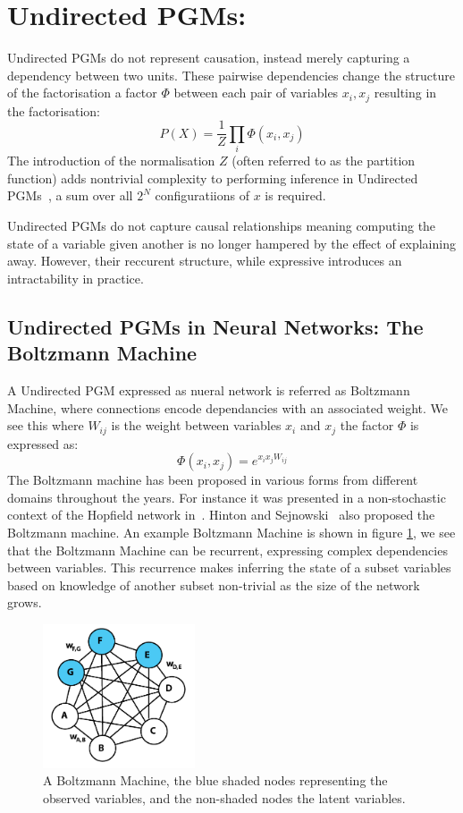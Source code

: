 \section{Undirected PGMs:}

Undirected PGMs do not represent causation, instead merely capturing a dependency between two units. These pairwise dependencies change the structure of the factorisation a factor $\Phi$ between each pair of variables $x_i,x_j$ resulting in the factorisation:
$$
P(X) = \frac{1}{Z} \prod_i \Phi(x_i, x_j)
$$
The introduction of the normalisation $Z$ (often referred to as the partition function) adds nontrivial complexity to performing inference in Undirected PGMs~\cite{Salakhutdinov08learningand}, a sum over all $2^N$ configuratiions of $x$ is required.

Undirected PGMs do not capture causal relationships meaning computing the state of a variable given another is no longer hampered by the effect of explaining away. However, their reccurent structure, while expressive introduces an intractability in practice.

\subsection{Undirected PGMs in Neural Networks: The Boltzmann Machine}
A Undirected PGM expressed as nueral network is referred as Boltzmann Machine, where connections encode dependancies with an associated weight. We see this where $W_{ij}$ is the weight between variables $x_i$ and $x_j$ the factor $\Phi$ is expressed as:
$$
\Phi(x_i, x_j) = e^{x_ix_jW_{ij}}
$$
The Boltzmann machine has been proposed in various forms from different domains throughout the years. For instance it was presented in a non-stochastic context of the Hopfield network in~\cite{Hopfield01041982}. Hinton and Sejnowski~\cite{geoffreye.hintonterrencej.sejnowski1983} also proposed the Boltzmann machine. An example Boltzmann Machine is shown in figure \ref{F:Boltzmann-Machine}, we see that the Boltzmann Machine can be recurrent, expressing complex dependencies between variables. This recurrence makes inferring the state of a subset variables based on knowledge of another subset non-trivial as the size of the network grows.
\begin{figure}[h]
\begin{center}
  \includegraphics[width = 0.4\textwidth]{Assets/Boltzmann_Machine.png}
\caption{A Boltzmann Machine, the blue shaded nodes representing the observed variables, and the non-shaded nodes the latent variables.}
\label{F:Boltzmann-Machine}
\end{center}
\end{figure}

